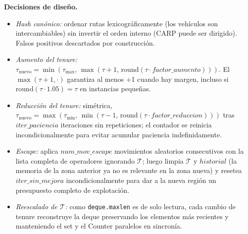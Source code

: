 \documentclass[12pt, a4paper]{article}
\begin{document}
\bigskip
\noindent
\textbf{Decisiones de diseño.}
\begin{itemize}
    \item \emph{Hash canónico:} ordenar rutas lexicográficamente (los vehículos
          son intercambiables) sin invertir el orden interno (CARP puede ser
          dirigido). Falsos positivos descartados por construcción.
    \item \emph{Aumento del tenure:} $\tau_{\mathrm{nuevo}} =
          \min(\tau_{\max},\, \max(\tau + 1,\,
          \mathrm{round}(\tau \cdot \mathit{factor\_aumento})))$. El
          $\max(\tau+1, \cdot)$ garantiza al menos +1 cuando hay margen,
          incluso si $\mathrm{round}(\tau \cdot 1.05) = \tau$ en instancias
          pequeñas.
    \item \emph{Reducción del tenure:} simétrica, $\tau_{\mathrm{nuevo}} =
          \max(\tau_{\min},\, \min(\tau - 1,\,
          \mathrm{round}(\tau \cdot \mathit{factor\_reduccion})))$ tras
          $\mathit{iter\_paciencia}$ iteraciones sin repeticiones; el
          contador se reinicia incondicionalmente para evitar acumular
          paciencia indefinidamente.
    \item \emph{Escape:} aplica $\mathit{num\_mov\_escape}$ movimientos
          aleatorios consecutivos con la lista completa de operadores
          ignorando $\mathcal{T}$; luego limpia $\mathcal{T}$ y
          $\mathit{historial}$ (la memoria de la zona anterior ya no es
          relevante en la zona nueva) y resetea $\mathit{iter\_sin\_mejora}$
          incondicionalmente para dar a la nueva región un presupuesto
          completo de explotación.
    \item \emph{Reescalado de $\mathcal{T}$:} como \texttt{deque.maxlen} es de
          solo lectura, cada cambio de tenure reconstruye la deque
          preservando los elementos más recientes y manteniendo el set y el
          Counter paralelos en sincronía.
\end{itemize}
\end{document}
